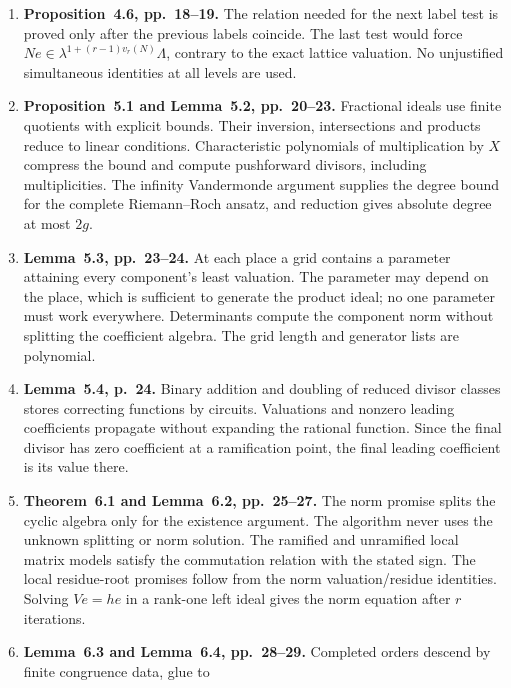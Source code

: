 \begin{enumerate}
induction gives the precise extension degree $r^{v_r(N)}$.
The quotient relation's second coordinate shows that fixed pairs
give genuinely fixed Jacobian points. Finite-field norm surjectivity
removes the constant obstruction to descending a divisor class and
its principal function.
\item \textbf{Proposition~4.6, pp.~18--19.} The relation needed
for the next label test is proved only after the previous labels
coincide. The last test would force
$Ne\in\lambda^{1+(r-1)v_r(N)}\Lambda$, contrary to the exact
lattice valuation. No unjustified simultaneous identities at all
levels are used.
\item \textbf{Proposition~5.1 and Lemma~5.2, pp.~20--23.}
Fractional ideals use finite quotients with explicit bounds. Their
inversion, intersections and products reduce to linear conditions.
Characteristic polynomials of multiplication by $X$ compress the
bound and compute pushforward divisors, including multiplicities.
The infinity Vandermonde argument supplies the degree bound for
the complete Riemann--Roch ansatz, and reduction gives absolute
degree at most $2g$.
\item \textbf{Lemma~5.3, pp.~23--24.} At each place a grid
contains a parameter attaining every component's least valuation.
The parameter may depend on the place, which is sufficient to
generate the product ideal; no one parameter must work everywhere.
Determinants compute the component norm without splitting the
coefficient algebra. The grid length and generator lists are
polynomial.
\item \textbf{Lemma~5.4, p.~24.} Binary addition and doubling
of reduced divisor classes stores correcting functions by circuits.
Valuations and nonzero leading coefficients propagate without
expanding the rational function. Since the final divisor has zero
coefficient at a ramification point, the final leading coefficient
is its value there.
\item \textbf{Theorem~6.1 and Lemma~6.2, pp.~25--27.} The norm
promise splits the cyclic algebra only for the existence argument.
The algorithm never uses the unknown splitting or norm solution.
The ramified and unramified local matrix models satisfy the
commutation relation with the stated sign. The local residue-root
promises follow from the norm valuation/residue identities.
Solving $Ve=he$ in a rank-one left ideal gives the norm equation
after $r$ iterations.
\item \textbf{Lemma~6.3 and Lemma~6.4, pp.~28--29.} Completed
orders descend by finite congruence data, glue to

\end{enumerate}
